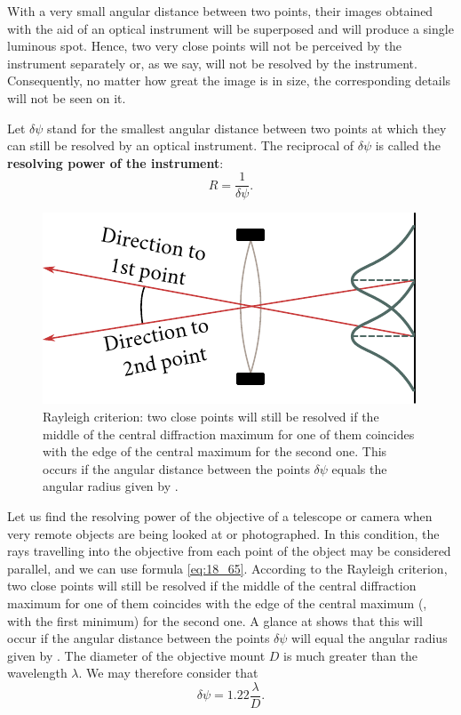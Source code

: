 With a very small angular distance between two points, their images obtained with the aid of an optical instrument will be superposed and will produce a single luminous spot.
Hence, two very close points will not be perceived by the instrument separately or, as we say, will not be resolved by the instrument.
Consequently, no matter how great the image is in size, the corresponding details will not be seen on it.

Let $\delta\psi$ stand for the smallest angular distance between two points at which they can still be resolved by an optical instrument.
The reciprocal of $\delta\psi$ is called the \textbf{resolving power of the instrument}:
\begin{equation}\label{eq:18_67}
	R = \frac{1}{\delta\psi}.
\end{equation}

\begin{figure}[t]
	\begin{center}
		\includegraphics[scale=0.9]{figures/ch_18/fig_18_48.pdf}
        \caption[]{Rayleigh criterion: two close points will still be resolved if the middle of the central diffraction maximum for one of them coincides with the edge of the central maximum for the second one. This occurs if the angular distance between the points $\delta\psi$ equals the angular radius given by .}
		\label{fig:18_48}
	\end{center}
	\vspace{-0.8cm}
\end{figure}

Let us find the resolving power of the objective of a telescope or camera when very remote objects are being looked at or photographed.
In this condition, the rays travelling into the objective from each point of the object may be considered parallel, and we can use formula \eqref{eq:18_65}.
According to the Rayleigh criterion, two close points will still be resolved if the middle of the central diffraction maximum for one of them coincides with the edge of the central maximum (\ie, with the first minimum) for the second one.
A glance at  shows that this will occur if the angular distance between the points $\delta\psi$ will equal the angular radius given by .
The diameter of the objective mount $D$ is much greater than the wavelength $\lambda$.
We may therefore consider that
\begin{equation*}
	\delta\psi = 1.22 \frac{\lambda}{D}.
\end{equation*}

